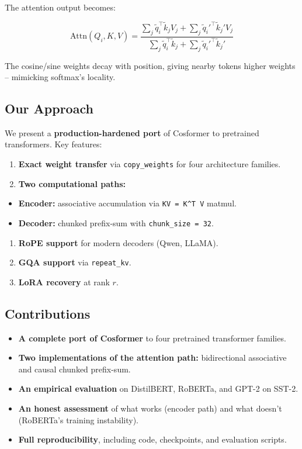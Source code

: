 The attention output becomes:

\[
\text{Attn}(Q_i, K, V) = \frac{\sum_j \tilde{q}_i^\top \tilde{k}_j V_j + \sum_j \tilde{q}_i'^\top \tilde{k}_j' V_j}{\sum_j \tilde{q}_i^\top \tilde{k}_j + \sum_j \tilde{q}_i'^\top \tilde{k}_j'}
\]

The cosine/sine weights decay with position, giving nearby tokens higher 
weights -- mimicking softmax's locality.

\subsection{Our Approach}

We present a \textbf{production-hardened port} of Cosformer to pretrained 
transformers. Key features:

\begin{enumerate}
\item \textbf{Exact weight transfer} via \texttt{copy\_weights} for four architecture families.
\item \textbf{Two computational paths:}
\end{enumerate}
\begin{itemize}
\item \textbf{Encoder:} associative accumulation via \texttt{KV = K^T V} matmul.
\item \textbf{Decoder:} chunked prefix-sum with \texttt{chunk\_size = 32}.
\end{itemize}
\begin{enumerate}
\item \textbf{RoPE support} for modern decoders (Qwen, LLaMA).
\item \textbf{GQA support} via \texttt{repeat\_kv}.
\item \textbf{LoRA recovery} at rank $r$.

\end{enumerate}
\subsection{Contributions}

\begin{itemize}
\item \textbf{A complete port of Cosformer} to four pretrained transformer families.
\item \textbf{Two implementations of the attention path:} bidirectional associative
  and causal chunked prefix-sum.
\item \textbf{An empirical evaluation} on DistilBERT, RoBERTa, and GPT-2 on SST-2.
\item \textbf{An honest assessment} of what works (encoder path) and what doesn't
  (RoBERTa's training instability).
\item \textbf{Full reproducibility}, including code, checkpoints, and evaluation scripts.

\end{itemize}
